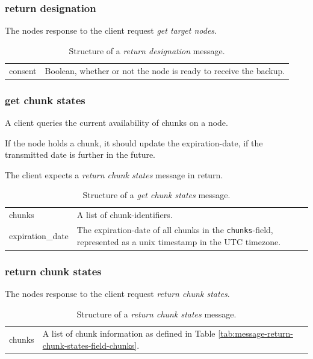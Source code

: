 \subsubsection{return designation}
The \glspl{node} response to the \gls{client} request \emph{get target nodes}.
\begin{table}[h!]
    \begin{tabu}{| >{\ttfamily}l | X |}
        consent
            & Boolean, whether or not the node is ready to receive the backup.
    \end{tabu}
    \caption[\emph{return designaton} Structure]{Structure of a \emph{return designation} \Gls{message}.}
    \label{tab:message-return-designation}
\end{table}

\subsubsection{get chunk states}
A \gls{client} queries the current availability of \glspl{chunk} on a \gls{node}.

If the \gls{node} holds a \gls{chunk}, it should update the \gls{expiration-date}, if the transmitted date is further in the future.

The client expects a \emph{return chunk states} \gls{message} in return.

\begin{table}[h!]
    \begin{tabu}{| >{\ttfamily}l | X |}
        chunks
            & A list of \glspl{chunk-identifier}. \\
        expiration\_date
            & The \gls{expiration-date} of all \glspl{chunk} in the \texttt{chunks}-field, represented as a unix timestamp in the UTC timezone.
    \end{tabu}
    \caption[\emph{get chunk states} Structure]{Structure of a \emph{get chunk states} \Gls{message}.}
    \label{tab:message-get-chunk-states}
\end{table}

\subsubsection{return chunk states}
The \glspl{node} response to the \gls{client} request \emph{return chunk states}.

\begin{table}[h!]
    \begin{tabu}{| >{\ttfamily}l | X |}
        chunks
            & A list of \gls{chunk} information as defined in Table \ref{tab:message-return-chunk-states-field-chunks}.
    \end{tabu}
    \caption[\emph{return chunk states} Structure]{Structure of a \emph{return chunk states} \Gls{message}.}
    \label{tab:message-return-chunk-states}
\end{table}

